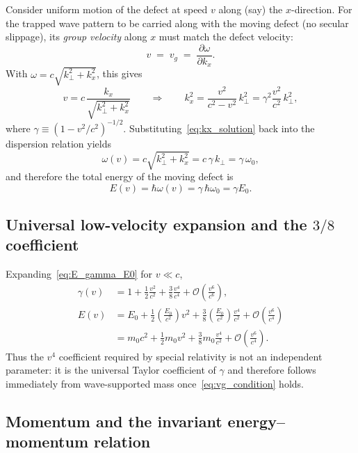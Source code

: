 \documentclass[11pt]{article}
\begin{document}
Consider uniform motion of the defect at speed $v$ along (say) the $x$-direction. For the trapped wave pattern to be carried along with the moving defect (no secular slippage), its \emph{group velocity} along $x$ must match the defect velocity:
\begin{equation}
v \;=\; v_g \;=\; \frac{\partial \omega}{\partial k_x}.
\label{eq:vg_condition}
\end{equation}
With $\omega = c\sqrt{k_\perp^2 + k_x^2}$, this gives
\begin{equation}
v
= c\,\frac{k_x}{\sqrt{k_\perp^2+k_x^2}}
\qquad \Longrightarrow \qquad
k_x^2 = \frac{v^2}{c^2-v^2}\,k_\perp^2
= \gamma^2\frac{v^2}{c^2}\,k_\perp^2,
\label{eq:kx_solution}
\end{equation}
where $\gamma \equiv (1-v^2/c^2)^{-1/2}$. Substituting~\eqref{eq:kx_solution} back into the dispersion relation yields
\begin{equation}
\omega(v) = c\sqrt{k_\perp^2+k_x^2}
= c\,\gamma\,k_\perp
= \gamma\,\omega_0,
\end{equation}
and therefore the total energy of the moving defect is
\begin{equation}
E(v) = \hbar\omega(v) = \gamma\,\hbar\omega_0 = \gamma E_0.
\label{eq:E_gamma_E0}
\end{equation}

\subsection{Universal low-velocity expansion and the \texorpdfstring{$3/8$}{3/8} coefficient}

Expanding~\eqref{eq:E_gamma_E0} for $v\ll c$,
\begin{align}
\gamma(v)
&= 1 + \frac{1}{2}\frac{v^2}{c^2} + \frac{3}{8}\frac{v^4}{c^4} + \mathcal O\!\left(\frac{v^6}{c^6}\right),
\\[4pt]
E(v)
&= E_0
+ \frac{1}{2}\left(\frac{E_0}{c^2}\right)v^2
+ \frac{3}{8}\left(\frac{E_0}{c^2}\right)\frac{v^4}{c^2}
+ \mathcal O\!\left(\frac{v^6}{c^4}\right)
\nonumber\\
&= m_0c^2 + \frac{1}{2}m_0 v^2 + \frac{3}{8}m_0\frac{v^4}{c^2}
+ \mathcal O\!\left(\frac{v^6}{c^4}\right).
\label{eq:E_series}
\end{align}
Thus the $v^4$ coefficient required by special relativity is not an independent parameter: it is the universal Taylor coefficient of $\gamma$ and therefore follows immediately from wave-supported mass once~\eqref{eq:vg_condition} holds.

\subsection{Momentum and the invariant energy--momentum relation}
\end{document}
